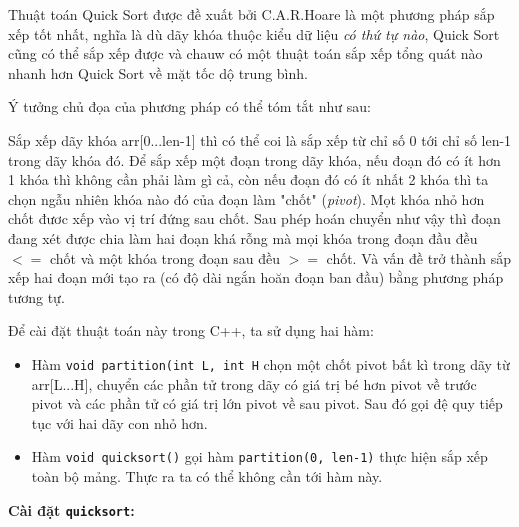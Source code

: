 \documentclass[a4paper]{article}
\newcommand{\mnt}[1]{\inputminted[frame=single, linenos=true, tabsize=4]{c++}{#1}}
\begin{document}
Thuật toán Quick Sort được đề xuất bởi C.A.R.Hoare là một phương pháp sắp xếp tốt nhất, nghĩa là dù dãy khóa thuộc kiểu dữ liệu \emph{có thứ tự nào}, Quick Sort cũng có thể sắp xếp được và chauw có một thuật toán sắp xếp tổng quát nào nhanh hơn Quick Sort về mặt tốc dộ trung bình. 

Ý tưởng chủ đọa của phương pháp có thể tóm tắt như sau:

Sắp xếp dãy khóa arr[0...len-1] thì có thể coi là sắp xếp từ chỉ số 0 tới chỉ số len-1 trong dãy khóa đó. Để sắp xếp một đoạn trong dãy khóa, nếu đoạn đó có ít hơn 1 khóa thì không cần phải làm gì cả, còn nếu đoạn đó có ít nhất 2 khóa thì ta chọn ngẫu nhiên khóa nào đó của đoạn làm "chốt" (\emph{pivot}). Mọt khóa nhỏ hơn chốt đươc xếp vào vị trí đứng sau chốt. Sau phép hoán chuyển như vậy thì đoạn đang xét được chia làm hai đoạn khá rỗng mà mọi khóa trong đoạn đầu đều $<=$ chốt và một khóa trong đoạn sau đều $>=$ chốt. Và vấn đề trở thành sắp xếp hai đoạn mới tạo ra (có độ dài ngắn hoăn đoạn ban đầu) bằng phương pháp tương tự.

Để cài đặt thuật toán này trong C++, ta sử dụng hai hàm:

\begin{itemize} 
\item Hàm \texttt{void partition(int L, int H} chọn một chốt pivot bất kì trong dãy từ arr[L...H], chuyển các phần tử trong dãy có giá trị bé hơn pivot về trước pivot và các phần tử có giá trị lớn pivot về sau pivot. Sau đó gọi đệ quy tiếp tục với hai dãy con nhỏ hơn.
\item Hàm \texttt{void quicksort()} gọi hàm \texttt{partition(0, len-1)} thực hiện sắp xếp toàn bộ mảng. Thực ra ta có thể không cần tới hàm này.
\end{itemize}

\textbf{Cài đặt \texttt{quicksort}: }
\mnt{src/quicksort.cpp}
\end{document}
